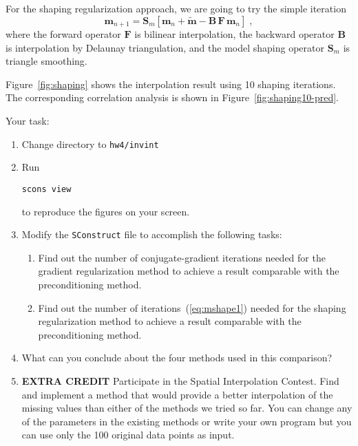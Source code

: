 For the shaping regularization approach, we are going to try the simple iteration
\begin{equation}
\label{eq:mshape1}
\mathbf{m}_{n+1} = \mathbf{S}_m\left[\mathbf{m}_{n} + \tilde{\mathbf{m}} -  \mathbf{B\,F\,m}_n\right]\;,
\end{equation}
where the forward operator $\mathbf{F}$ is bilinear interpolation, the
backward operator $\mathbf{B}$ is interpolation by Delaunay
triangulation, and the model shaping operator $\mathbf{S}_m$ is
triangle smoothing.

Figure~\ref{fig:shaping} shows the interpolation result using
10 shaping iterations. The corresponding correlation analysis is shown
in Figure~\ref{fig:shaping10-pred}.



Your task:
\begin{enumerate}
\item Change directory to \texttt{hw4/invint}
\item Run 
\begin{verbatim}
scons view
\end{verbatim}
to reproduce the figures on your screen.
\item Modify the \texttt{SConstruct} file to accomplish the following
  tasks:
\begin{enumerate}
\item Find out 
the number of conjugate-gradient iterations needed for the gradient regularization method to achieve a result 
 comparable with the preconditioning method.
\item Find out 
the number of iterations~(\ref{eq:mshape1}) needed for the shaping regularization method to achieve a result 
 comparable with the preconditioning method.
\end{enumerate}
\item What can you conclude about the four methods used in this comparison?
\item \textbf{EXTRA CREDIT} Participate in the Spatial Interpolation Contest. Find and
implement a method that would provide a better interpolation of the
missing values than either of the methods we tried so far. You can
change any of the parameters in the existing methods or write your own
program but you can use only the 100 original data points as input.
\end{enumerate}

